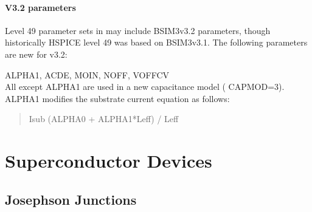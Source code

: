 \paragraph{V3.2 parameters}

Level 49 parameter sets in {\WRspice} may include BSIM3v3.2
parameters, though historically HSPICE level 49 was based on
BSIM3v3.1.  The following parameters are new for v3.2:

\begin{description}
\item{{\vt ALPHA1}, {\vt ACDE}, {\vt MOIN}, {\vt NOFF}, {\vt VOFFCV}}\\
 All except {\vt ALPHA1} are used in a new capacitance model ({\vt
 CAPMOD=3}).  {\vt ALPHA1} modifies the substrate current equation as
 follows:
\begin{quote}
 {\vt Isub  (ALPHA0 + ALPHA1*Leff) / Leff}
\end{quote}
\end{description}


\newpage
\section{Superconductor Devices}

\subsection{Josephson Junctions}



